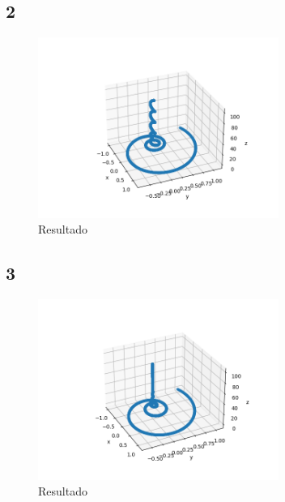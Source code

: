 \documentclass{article}
\begin{document}
\subsection{2}
\begin{figure}[H]
    \centering
    \includegraphics[width=0.7\textwidth]{desa2.png}
    \caption{Resultado}
\end{figure}

\subsection{3}
\begin{figure}[H]
    \centering
    \includegraphics[width=0.7\textwidth]{desa3.png}
    \caption{Resultado}
\end{figure}
\end{document}
